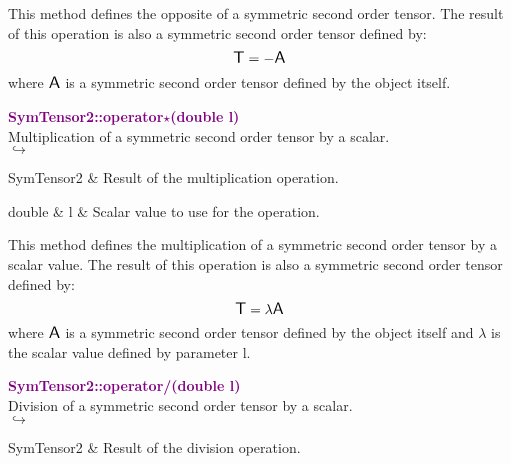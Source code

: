 This method defines the opposite of a symmetric second order tensor.
The result of this operation is also a symmetric second order tensor defined by:
\begin{equation*}
\mbox{\large\ensuremath{\mathsf{T}}} = - \mbox{\large\ensuremath{\mathsf{A}}}
\end{equation*}
where $\mbox{\large\ensuremath{\mathsf{A}}}$ is a symmetric second order tensor defined by the object itself.

\textcolor{purple}{\textbf{SymTensor2::operator$\star$(double l)}}\label{SymTensor2::operator*(double l)}\\
Multiplication of a symmetric second order tensor by a scalar.\\ \hspace*{5mm}$\hookrightarrow$
\vspace*{-2em}\begin{tcolorbox}[grow to left by=-1cm, width=\textwidth-1cm,myArgs,tabularx={l|R}]
SymTensor2 & Result of the multiplication operation.
\end{tcolorbox}

\begin{tcolorbox}[width=\textwidth,myArgs,tabularx={ll|R}]
double & l & Scalar value to use for the operation.
\end{tcolorbox}

This method defines the multiplication of a symmetric second order tensor by a scalar value.
The result of this operation is also a symmetric second order tensor defined by:
\begin{equation*}
\mbox{\large\ensuremath{\mathsf{T}}} = \lambda \mbox{\large\ensuremath{\mathsf{A}}}
\end{equation*}
where $\mbox{\large\ensuremath{\mathsf{A}}}$ is a symmetric second order tensor defined by the object itself and $\lambda$ is the scalar value defined by parameter l.

\textcolor{purple}{\textbf{SymTensor2::operator/(double l)}}\label{SymTensor2::operator/(double l)}\\
Division of a symmetric second order tensor by a scalar.\\ \hspace*{5mm}$\hookrightarrow$
\vspace*{-2em}\begin{tcolorbox}[grow to left by=-1cm, width=\textwidth-1cm,myArgs,tabularx={l|R}]
SymTensor2 & Result of the division operation.
\end{tcolorbox}

